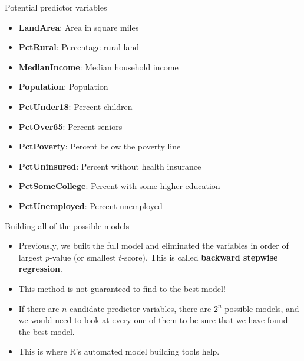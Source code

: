 \documentclass{beamer}\usepackage[]{graphicx}\usepackage[]{color}
\makeatletter
\newcommand{\hlnum}[1]{\textcolor[rgb]{0.824,0.412,0.118}{#1}}%
\newcommand{\hlcom}[1]{\textcolor[rgb]{0.824,0.706,0.549}{#1}}%
\newcommand{\hlopt}[1]{\textcolor[rgb]{1,0.894,0.769}{#1}}%
\newcommand{\hlstd}[1]{\textcolor[rgb]{1,0.894,0.769}{#1}}%
\newcommand{\hlkwd}[1]{\textcolor[rgb]{1,0.78,0.769}{#1}}%
\newenvironment{kframe}{%
 \def\at@end@of@kframe{}%
 \ifinner\ifhmode%
  \def\at@end@of@kframe{\end{minipage}}%
  \begin{minipage}{\columnwidth}%
 \fi\fi%
 \def\FrameCommand##1{\hskip\@totalleftmargin \hskip-\fboxsep
 \colorbox{shadecolor}{##1}\hskip-\fboxsep
     \hskip-\linewidth \hskip-\@totalleftmargin \hskip\columnwidth}%
 \MakeFramed {\advance\hsize-\width
   \@totalleftmargin\z@ \linewidth\hsize
   \@setminipage}}%
 {\par\unskip\endMakeFramed%
 \at@end@of@kframe}
\newenvironment{knitrout}{}{} %
\makeatother
\begin{document}
\begin{darkframes}

    \begin{frame}[fragile]{Potential predictor variables}
      \begin{itemize}
        \item \textbf{LandArea}:       Area in square miles
        \item \textbf{PctRural}:       Percentage rural land
        \item \textbf{MedianIncome}:   Median household income
        \item \textbf{Population}:     Population
        \item \textbf{PctUnder18}:     Percent children
        \item \textbf{PctOver65}:      Percent seniors
        \item \textbf{PctPoverty}:     Percent below the poverty line
        \item \textbf{PctUninsured}:   Percent without health insurance
        \item \textbf{PctSomeCollege}: Percent with some higher education
        \item \textbf{PctUnemployed}:  Percent unemployed
      \end{itemize}
    \end{frame}

    \begin{frame}[fragile]{Building all of the possible models}
      \begin{itemize}[<+->]
        \item Previously, we built the full model and eliminated the variables in order of largest 
        $p$-value (or smallest $t$-score). This is called \textbf{backward stepwise regression}.
        \item This method is not guaranteed to find to the best model!
        \item If there are $n$ candidate predictor variables, there are $2^n$ possible models, and we would need to look at every one of them to be sure that we have found the best model.
        \item This is where R's automated model building tools help.
      \end{itemize} 
    \end{frame}


\end{darkframes}
\end{document}
